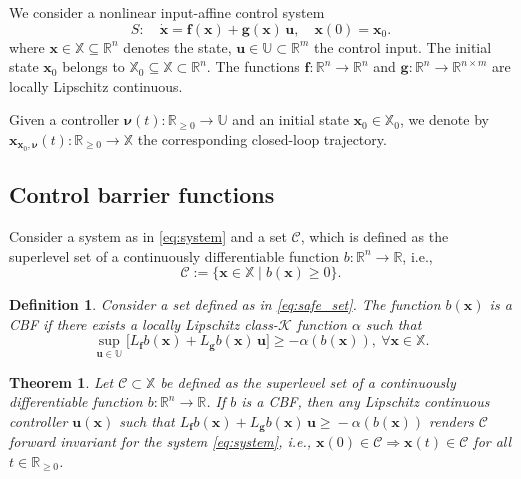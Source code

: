 \documentclass[letterpaper, 10 pt, conference]{ieeeconf}  %
\newtheorem{definition}{Definition}
\newtheorem{theorem}{Theorem}
\begin{document}
We consider a nonlinear input-affine control system
\begin{equation} \label{eq:system}
    S: \quad \dot{\mathbf{x}} = \mathbf{f}(\mathbf{x}) + \mathbf{g}(\mathbf{x}) \, \mathbf{u}, \quad \mathbf{x}(0) = \mathbf{x}_0.
\end{equation}
where $\mathbf{x} \in \mathbb{X} \subseteq \mathbb{R}^n$ denotes the state, $\mathbf{u} \in \mathbb{U} \subset \mathbb{R}^m$ the control input. The initial state $\mathbf{x}_0$ belongs to $\mathbb{X}_0 \subseteq \mathbb{X} \subset \mathbb{R}^n$. The functions $\mathbf{f}: \mathbb{R}^n \rightarrow \mathbb{R}^n$ and $\mathbf{g}: \mathbb{R}^n \rightarrow \mathbb{R}^{n \times m}$ are locally Lipschitz continuous.

Given a controller $\boldsymbol{\nu}(t): \mathbb{R}_{\ge 0} \rightarrow \mathbb{U}$ and an initial state $\mathbf{x}_0 \in \mathbb{X}_0$, we denote by $\mathbf{x}_{\mathbf{x}_0, \boldsymbol{\nu}}(t): \mathbb{R}_{\ge 0} \to \mathbb{X}$ the corresponding closed-loop trajectory.

\subsection{Control barrier functions}

Consider a system as in \eqref{eq:system} and a set $\mathcal{C}$, which is defined as the superlevel set of a continuously differentiable function $b: \mathbb{R}^n \to \mathbb{R}$, i.e., 
\begin{equation} \label{eq:safe_set}
    \mathcal{C} := \{\mathbf{x} \in \mathbb{X} \mid b(\mathbf{x}) \ge 0 \}.
\end{equation}  

\begin{definition}\label{def:cbf}
    Consider a set defined as in \eqref{eq:safe_set}. The function $b(\mathbf{x})$ is a CBF if there exists a locally Lipschitz class-$\mathcal{K}$ function $\alpha$ such that 
    \begin{equation} \label{eq:cbf}
       \sup_{\mathbf{u} \in \mathbb{U}} \Big[ L_\mathbf{f} b ( \mathbf{x}) + L_\mathbf{g} b ( \mathbf{x}) \, \mathbf{u} \Big] \ge -\alpha(b(\mathbf{x})), \ \forall \mathbf{x} \in \mathbb{X}.
    \end{equation}
\end{definition}

\begin{theorem} \label{thm:forward_invariance}
    \cite{ames2019} Let $\mathcal{C} \subset \mathbb{X}$ be defined as the superlevel set of a continuously differentiable function $b: \mathbb{R}^n \rightarrow \mathbb{R}$. If $b$ is a CBF, then any Lipschitz continuous controller $\mathbf{u}(\mathbf{x})$ such that $L_\mathbf{f} b ( \mathbf{x}) + L_\mathbf{g} b ( \mathbf{x}) \, \mathbf{u} \!\ge\! -\alpha(b(\mathbf{x}))$ renders $\mathcal{C}$ forward invariant for the system \eqref{eq:system}, i.e., $  \mathbf{x}(0) \in \mathcal{C} \Rightarrow \mathbf{x}(t) \in \mathcal{C} $ for all $t \in \mathbb{R}_{\ge 0}$.
\end{theorem}
\end{document}
